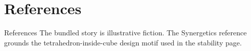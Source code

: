 \documentclass[
  ignorenonframetext,
]{beamer}
\author{\texorpdfstring{}{}}
\date{}
\begin{document}
\section{References}\label{references}

\begin{frame}[allowframebreaks]{References}
The bundled story is illustrative fiction. The Synergetics reference
grounds the tetrahedron-inside-cube design motif used in the stability
page.
\end{frame}
\end{document}

